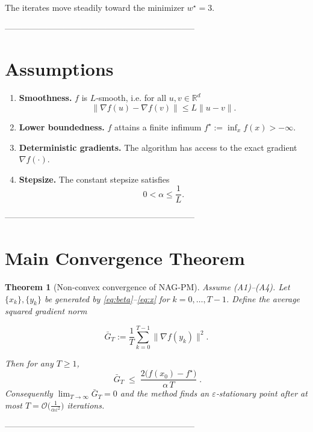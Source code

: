 \documentclass[11pt]{article}
\newtheorem{theorem}{Theorem}
\newcommand{\R}{\mathbb{R}}
\begin{document}
The iterates move steadily toward the minimizer $w^\star=3$.

--------------------------------------------------------------------

\section*{Assumptions}
\begin{enumerate}[label=(A\arabic*)]
\item \textbf{Smoothness.} $f$ is $L$‑smooth, i.e. for all $u,v\in\R^{d}$  
\[
\|\nabla f(u)-\nabla f(v)\|\le L\|u-v\|. \tag{A1}
\]
\item \textbf{Lower boundedness.} $f$ attains a finite infimum $f^\star:=\inf_{x}f(x)>-\infty$. 
\item \textbf{Deterministic gradients.} The algorithm has access to the exact gradient $\nabla f(\cdot)$. 
\item \textbf{Stepsize.} The constant stepsize satisfies  
\[
0<\alpha\le\frac{1}{L}. \tag{A4}
\]
\end{enumerate}

--------------------------------------------------------------------

\section*{Main Convergence Theorem}
\begin{theorem}[Non‑convex convergence of NAG‑PM]\label{thm:main}
Assume (A1)–(A4). Let $\{x_k\},\{y_k\}$ be generated by \eqref{eq:beta}–\eqref{eq:x}
for $k=0,\dots,T-1$. Define the average squared gradient norm  

\[
\bar{G}_T:=\frac{1}{T}\sum_{k=0}^{T-1}\|\nabla f(y_k)\|^{2}.
\]

Then for any $T\ge 1$,
\[
\boxed{\;
\bar{G}_T\;\le\;\frac{2\bigl(f(x_0)-f^\star\bigr)}{\alpha\,T}\; }.
\tag{T1}
\]
Consequently $\displaystyle\lim_{T\to\infty}\bar{G}_T=0$ and the method finds an
$\varepsilon$‑stationary point after at most 
$T= \mathcal{O}\!\bigl(\frac{1}{\alpha\varepsilon^{2}}\bigr)$ iterations.
\end{theorem}

--------------------------------------------------------------------
\end{document}
